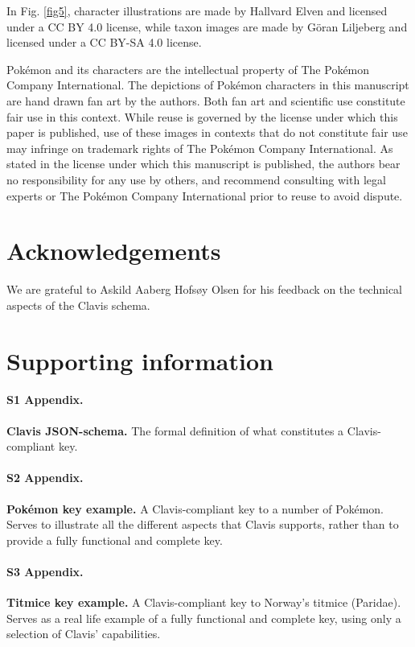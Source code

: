 \documentclass[10pt,letterpaper]{article}
\begin{document}
In Fig. \ref{fig5}, character illustrations are made by Hallvard Elven and licensed under a CC BY 4.0 license, while taxon images are made by Göran Liljeberg and licensed under a CC BY-SA 4.0 license.

Pokémon and its characters are the intellectual property of The Pokémon Company International. The depictions of Pokémon characters in this manuscript are hand drawn fan art by the authors. Both fan art and scientific use constitute fair use in this context. While reuse is governed by the license under which this paper is published, use of these images in contexts that do not constitute fair use may infringe on trademark rights of The Pokémon Company International. As stated in the license under which this manuscript is published, the authors bear no responsibility for any use by others, and recommend consulting with legal experts or The Pokémon Company International prior to reuse to avoid dispute.

\section*{
Acknowledgements
}
We are grateful to Askild Aaberg Hofsøy Olsen for his feedback on the technical aspects of the Clavis schema. 
\nolinenumbers


\section*{
Supporting information
}

\paragraph*{S1 Appendix.}
\label{S1_Appendix}
{\bf Clavis JSON-schema.} The formal definition of what constitutes a Clavis-compliant key.

\paragraph*{S2 Appendix.}
\label{S2_Appendix}
{\bf Pokémon key example.} A Clavis-compliant key to a number of Pokémon. Serves to illustrate all the different aspects that Clavis supports, rather than to provide a fully functional and complete key.

\paragraph*{S3 Appendix.}
\label{S3_Appendix}
{\bf Titmice key example.} A Clavis-compliant key to Norway's titmice (Paridae). Serves as a real life example of a fully functional and complete key, using only a selection of Clavis' capabilities.
\end{document}
